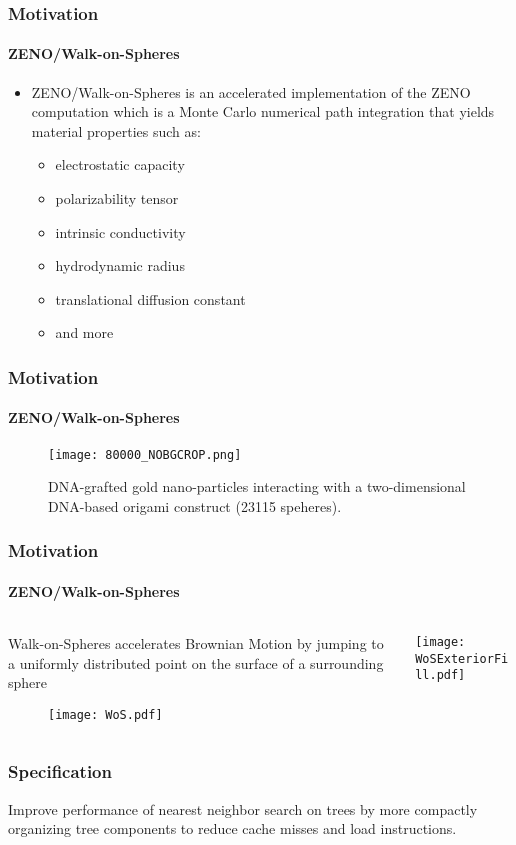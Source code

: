 
\begin{frame}
  \frametitle{Motivation}
  \framesubtitle{ZENO/Walk-on-Spheres}

  \begin{itemize}
    \item ZENO/Walk-on-Spheres is an accelerated implementation of the ZENO computation which is a Monte Carlo
      numerical path integration that yields material properties such as:
    \begin{itemize}
      \item electrostatic capacity
      \item polarizability tensor
      \item intrinsic conductivity 
      \item hydrodynamic radius
      \item translational diffusion constant
      \item and more
    \end{itemize}
  \end{itemize}

\end{frame}

\begin{frame}
  \frametitle{Motivation}
  \framesubtitle{ZENO/Walk-on-Spheres}

  \begin{figure}
    \centering
    \texttt{[image: 80000\_NOBGCROP.png]}
    \caption{DNA-grafted gold nano-particles interacting with a 
    two-dimensional DNA-based origami construct (23115 speheres).}
    \label{fig:80000}
  \end{figure}
\end{frame}

\begin{frame}
  \frametitle{Motivation}
  \framesubtitle{ZENO/Walk-on-Spheres}

  \begin{columns}[T]
    \begin{column}{.5\textwidth}
      \begin{block}{}%
        {\color{white} Walk-on-Spheres accelerates Brownian Motion by jumping %
          to a uniformly distributed point on the surface of a surrounding sphere}
      \end{block}
      \vspace{-1cm}%
      \begin{block}{}%
        \begin{figure}
          \centering
          \texttt{[image: WoS.pdf]}
        \end{figure}
      \end{block}
    \end{column}
    \begin{column}{.5\textwidth}
      \begin{block}{}%
        \texttt{[image: WoSExteriorFill.pdf]}
      \end{block}
    \end{column}
  \end{columns}
\end{frame}

\begin{frame}
  \frametitle{Specification}

  {\color{white}
  Improve performance of nearest neighbor search on \kd trees by more compactly organizing tree components
  to reduce cache misses and load instructions.}

\end{frame}
